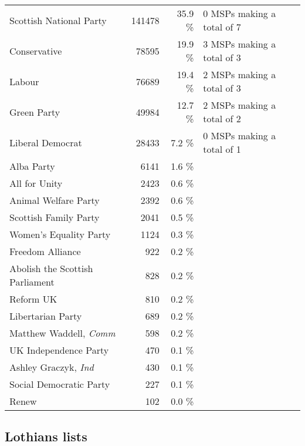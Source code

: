 \noindent
\begin{tabular*}{\textwidth}{@{\extracolsep{\fill}} p{}<{\dotfill} r r<{\%} p{} @{\extracolsep{\fill}}}
	Scottish National Party & 141478 & 35.9 & 0 MSPs making a total of 7\\
	Conservative & 78595 & 19.9 & 3 MSPs making a total of 3\\
	Labour & 76689 & 19.4 & 2 MSPs making a total of 3\\
	Green Party & 49984 & 12.7 & 2 MSPs making a total of 2\\
	Liberal Democrat & 28433 & 7.2 & 0 MSPs making a total of 1\\
	Alba Party & 6141 & 1.6 & \\
	All for Unity & 2423 & 0.6 & \\
	Animal Welfare Party & 2392 & 0.6 & \\
	Scottish Family Party & 2041 & 0.5 & \\
	Women's Equality Party & 1124 & 0.3 & \\
	Freedom Alliance & 922 & 0.2 & \\
	Abolish the Scottish Parliament & 828 & 0.2 & \\
	Reform UK & 810 & 0.2 & \\
	Libertarian Party & 689 & 0.2 & \\
	Matthew Waddell, \emph{Comm} & 598 & 0.2 & \\
	UK Independence Party & 470 & 0.1 & \\
	Ashley Graczyk, \emph{Ind} & 430 & 0.1 & \\
	Social Democratic Party & 227 & 0.1 & \\
	Renew & 102 & 0.0 & \\
\end{tabular*}

\subsection*{Lothians lists}

